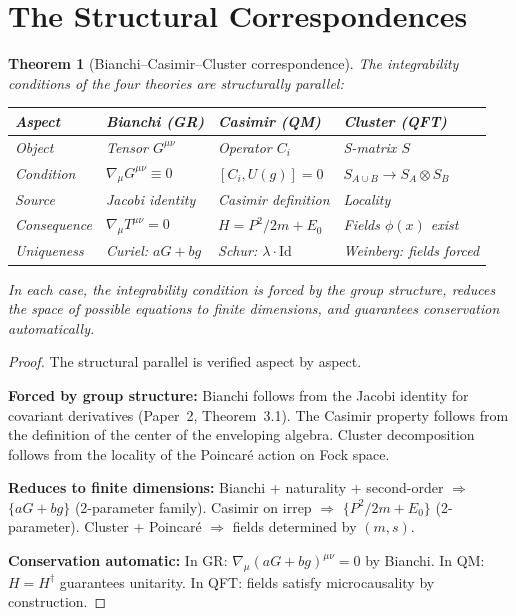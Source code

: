\documentclass[12pt]{article}
\theoremstyle{plain}
\newtheorem{theorem}{Theorem}[section]
\theoremstyle{definition}
\theoremstyle{remark}
\begin{document}
\section{The Structural Correspondences}
\label{sec:correspondences}

\begin{theorem}[Bianchi--Casimir--Cluster correspondence]\label{thm:correspondence}
The integrability conditions of the four theories are structurally parallel:

\begin{center}\small
\begin{tabular}{lp{2.5cm}p{2.5cm}p{2.5cm}}\toprule
\textbf{Aspect} & \textbf{Bianchi (GR)} & \textbf{Casimir (QM)} & \textbf{Cluster (QFT)} \\\midrule
Object & Tensor $G^{\mu\nu}$ & Operator $C_i$ & S-matrix $S$ \\[3pt]
Condition & $\nabla_\mu G^{\mu\nu} \equiv 0$ & $[C_i, U(g)] = 0$ & $S_{A \cup B} \!\to\! S_A \!\otimes\! S_B$ \\[3pt]
Source & Jacobi identity & Casimir definition & Locality \\[3pt]
Consequence & $\nabla_\mu T^{\mu\nu}\!=\!0$ & $H\!=\!P^2/2m\!+\!E_0$ & Fields $\phi(x)$ exist \\[3pt]
Uniqueness & Curiel: $aG\!+\!bg$ & Schur: $\lambda \!\cdot\! \mathrm{Id}$ & Weinberg: fields forced \\
\bottomrule
\end{tabular}
\end{center}

In each case, the integrability condition is \emph{forced by the group structure}, \emph{reduces the space of possible equations} to finite dimensions, and \emph{guarantees conservation automatically}.
\end{theorem}

\begin{proof}
The structural parallel is verified aspect by aspect.

\textbf{Forced by group structure:} Bianchi follows from the Jacobi identity for covariant derivatives (Paper~2, Theorem~3.1). The Casimir property follows from the definition of the center of the enveloping algebra. Cluster decomposition follows from the locality of the Poincar\'e action on Fock space.

\textbf{Reduces to finite dimensions:} Bianchi + naturality + second-order $\Rightarrow$ $\{aG + bg\}$ (2-parameter family). Casimir on irrep $\Rightarrow$ $\{P^2/2m + E_0\}$ (2-parameter). Cluster + Poincar\'e $\Rightarrow$ fields determined by $(m, s)$.

\textbf{Conservation automatic:} In GR: $\nabla_\mu(aG + bg)^{\mu\nu} = 0$ by Bianchi. In QM: $H = H^\dagger$ guarantees unitarity. In QFT: fields satisfy microcausality by construction.
\end{proof}
\end{document}
